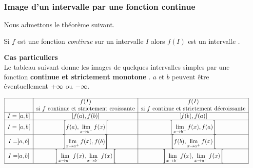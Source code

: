 \subsubsection*{Image d'un intervalle par une fonction continue}
Nous admettons le théorème suivant.
\begin{theorem}
Si $ f $ est une fonction \emph{continue} sur  un intervalle $ I $ alors $ f(I) $ est un intervalle .
\end{theorem}
\textbf{Cas particuliers}\\
Le tableau suivant donne les images de quelques intervalles simples par une fonction \textbf{continue et strictement monotone }.  $ a$ et $b $ peuvent être éventuellement $+\infty $ ou $-\infty .$ 

$$
\begin{array}{|c|c|c|}
\hline
& \text{\(f(I)\)} & \text{\(f(I)\)} \\
& \text{si \(f\) continue et strictement croissante} & \text{si \(f\) continue et strictement décroissante} \\
\hline
I = [a,b] & [f(a), f(b)] & [f(b), f(a)] \\
\hline
I = [a,b[ & \left[ f(a), \lim\limits_{x \to b^-} f(x) \right[ & \left] \lim\limits_{x \to b^-} f(x), f(a) \right] \\
\hline
I = ]a,b] & \left] \lim\limits_{x \to a^+} f(x), f(b) \right] & \left[ f(b), \lim\limits_{x \to a^+} f(x) \right[ \\
\hline
I = ]a,b[ & \left] \lim\limits_{x \to a^+} f(x), \lim\limits_{x \to b^-} f(x) \right[ & \left] \lim\limits_{x \to b^-} f(x), \lim\limits_{x \to a^+} f(x) \right[ \\
\hline
\end{array}
$$

